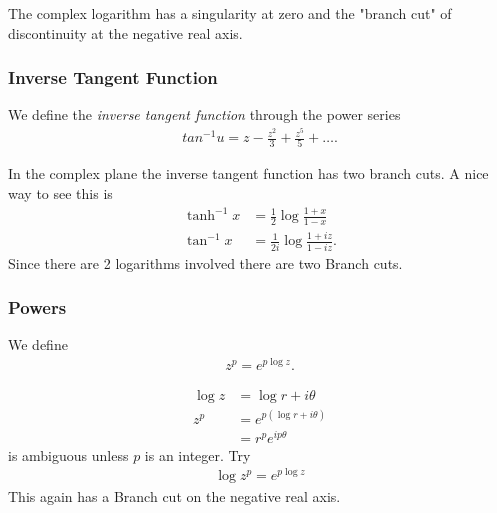 The complex logarithm has a singularity at zero and the "branch cut" of discontinuity at the negative real axis.

\subsubsection{Inverse Tangent Function} 
\begin{df}
	We define the \emph{inverse tangent function} through the power series
\begin{align*}
tan^{-1} u = z - \frac{z^2} 3 + \frac{z^5} 5 + \dots.
\end{align*}
\end{df}
In the complex plane the inverse tangent function has two branch cuts.
A nice way to see this is
\begin{align*}
\tanh^{-1} x & = \frac 1 2 \log \frac{1+x}{1-x} \\
\tan^{-1} x & = \frac 1 {2i} \log \frac{1+iz}{1-iz}.
\end{align*}
Since there are 2 logarithms involved there are two Branch cuts.

\subsubsection{Powers} 
\begin{df}
We define 
\begin{align*}
z^p = e^{p \log z}.
\end{align*}
\end{df}


\begin{align*}
\log z & = \log r + i \theta \\
z^p & = e^{p( \log r + i \theta)} \\
& = r^p e^{ip \theta}
\end{align*}
is ambiguous unless $p$ is an integer. Try
\begin{align*}
\log z^p = e^{p \log z}
\end{align*}
This again has a Branch cut on the negative real axis.